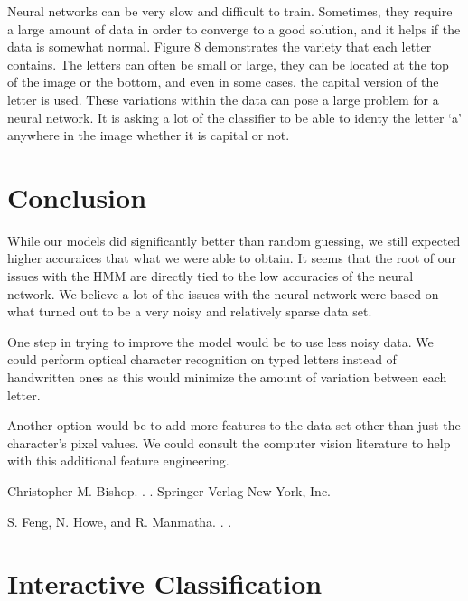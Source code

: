 \documentclass[11pt,letterpaper]{article}
\begin{document}
Neural networks can be very slow and difficult to train. Sometimes, they
require a large amount of data in order to converge to a good solution, and it
helps if the data is somewhat normal. Figure 8 demonstrates the variety that
each letter contains. The letters can often be small or large, they can be
located at the top of the image or the bottom, and even in some cases, the
capital version of the letter is used. These variations within the data can
pose a large problem for a neural network. It is asking a lot of the classifier
to be able to identy the letter `a' anywhere in the image whether it is capital
or not.

\section{Conclusion}

While our models did significantly better than random guessing, we still expected higher accuraices
that what we were able to obtain. It seems that the root of our issues with the HMM are directly
tied to the low accuracies of the neural network. We believe a lot of the issues with the neural
network were based on what turned out to be a very noisy and relatively sparse data set. 

One step in trying to improve the model would be to use less noisy data. We could perform optical
character recognition on typed letters instead of handwritten ones as this would minimize the amount
of variation between each letter.

Another option would be to add more features to the data set other than just the character's pixel
values. We could consult the computer vision literature to help with this additional feature
engineering.


\begin{thebibliography}{}

\newblock Christopher M. Bishop.
.
.
\newblock Springer-Verlag New York, Inc.

\newblock S. Feng, N. Howe, and R. Manmatha.
.
.

\end{thebibliography}


\newpage
\appendix
\section{Interactive Classification}
\end{document}
